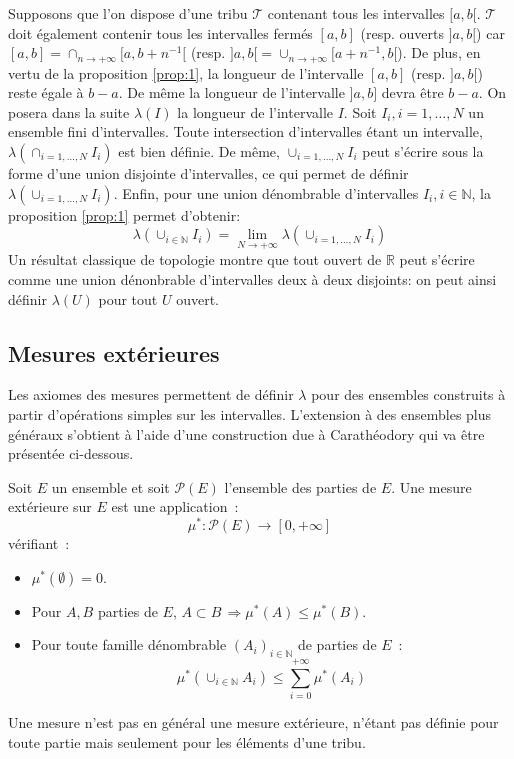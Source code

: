 Supposons que l'on dispose
d'une tribu $\mathcal{T}$ contenant tous les intervalles $[a,b[$.
$\mathcal{T}$ doit également contenir tous les intervalles fermés $[a,b]$
(resp. ouverts $]a,b[$) car $[a,b] = \cap_{n \to +\infty} [a, b + n^{-1}[$
(resp. $]a,b[ = \cup_{n \to +\infty} [a + n^{-1}, b[$). De plus, en vertu de la
proposition \ref{prop:1}, la longueur de l'intervalle $[a,b]$ (resp. $]a,b[$)
reste égale à $b-a$. De même la longueur de l'intervalle $]a,b]$ devra être
$b-a$. On posera dans la suite $\lambda(I)$ la longueur de l'intervalle $I$.
Soit $I_i, i=1, \dots, N$ un ensemble fini d'intervalles. Toute intersection
d'intervalles étant un intervalle, $\lambda \left( \cap_{i=1,\dots,N}
I_i\right)$ est bien définie. De même, $\cup_{i=1, \dots, N} I_i$ peut s'écrire
sous la forme d'une union disjointe d'intervalles, ce qui permet de définir
$\lambda \left( \cup_{i=1,\dots,N} I_i\right)$.
Enfin, pour une union dénombrable d'intervalles $I_i, i\in \mathbb{N}$, la
proposition \ref{prop:1} permet d'obtenir:
\[
\lambda \left( \cup_{i \in
\mathbb{N}} I_i \right)  = \lim_{ N \to + \infty} \lambda \left( \cup_{i=1,
\dots, N} I_i \right)
\]
Un résultat classique de topologie montre que tout ouvert de $\mathbb{R}$ peut
s'écrire comme une union dénonbrable d'intervalles deux à deux disjoints: on
peut ainsi définir $\lambda(U)$ pour tout $U$ ouvert.

\subsection{Mesures extérieures}
Les axiomes des mesures permettent de définir $\lambda$ pour des ensembles
construits à partir d'opérations simples sur les intervalles. L'extension à des
ensembles plus généraux s'obtient à l'aide d'une construction due à Carathéodory
qui va être présentée ci-dessous.
\begin{mandatory}
\begin{defn}
Soit $E$ un ensemble et soit $\mathcal{P}(E)$ l'ensemble des parties
de $E$. Une mesure extérieure sur $E$ est une application~:
\[
\mu^* : \mathcal{P}(E) \to [0,+\infty]
\]
 vérifiant~:
\begin{itemize}
\item $\mu^*(\emptyset) = 0$.
\item Pour $A,B$ parties de $E$, $A \subset B \, \Rightarrow \mu^*(A)
  \leq \mu^*(B)$.
\item Pour toute famille dénombrable $(A_i)_{i \in \mathbb{N}}$ de parties de $E$~:
\[
\mu^*(\cup_{i \in \mathbb{N}} A_i) \leq \sum_{i=0}^{+\infty} \mu^*(A_i)
\]
\end{itemize}
\end{defn}
\end{mandatory}
Une mesure n'est pas en général une mesure extérieure, n'étant pas définie
pour toute partie mais seulement pour les éléments d'une
tribu. 

